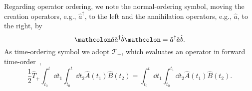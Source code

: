 Regarding operator ordering, we note the normal-ordering symbol, moving the creation operators, e.g., $\hat{a}^\dagger$, to the left and the annihilation operators, e.g., $\hat{a}$, to the right, by
\begin{equation*}
	\norder{\hat{a}\hat{a}^\dagger\hat{b}}
	=
	\hat{a}^\dagger
	\hat{a}
	\hat{b}
	.
\end{equation*}
As time-ordering symbol we adopt $\mathcal{T}_+$, which evaluates an operator in forward time-order~\cite[p.~84]{Peskin1995},
\begin{equation*}
	\frac{1}{2}
	\hat{T}_+
	\int_{t_0}^t\dd{t_1}
	\int_{t_0}^t\dd{t_2}
	\hat{A}(t_1)
	\hat{B}(t_2)
	=
	\int_{t_0}^t\dd{t_1}
	\int_{t_0}^{t_1}\dd{t_2}
	\hat{A}(t_1)
	\hat{B}(t_2)
	.
\end{equation*}